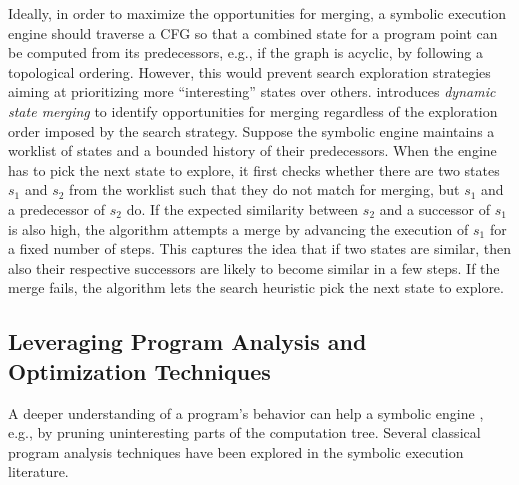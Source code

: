 
 Ideally, in order to maximize the opportunities for merging, a symbolic execution engine should traverse a CFG so that a combined state for a program point can be computed from its predecessors, e.g., if the graph is acyclic, by following a topological ordering. However, this would prevent search exploration strategies aiming at prioritizing more ``interesting'' states over others. \cite{KKB-PLDI12} introduces {\em dynamic state merging} to identify opportunities for merging regardless of the exploration order imposed by the search strategy.
Suppose the symbolic engine maintains a worklist of states and a bounded history of their predecessors. When the engine has to pick the next state to explore, it first checks whether there are two states $s_1$ and $s_2$ from the worklist such that they do not match for merging, but $s_1$ and a predecessor of $s_2$ do. If the expected similarity between $s_2$ and a successor of $s_1$ is also high, the algorithm attempts a merge by advancing the execution of $s_1$ for a fixed number of steps. This captures the idea that if two states are similar, then also their respective successors are likely to become similar in a few steps. If the merge fails, the algorithm lets the search heuristic pick the next state to explore.


\subsection{Leveraging Program Analysis and Optimization Techniques}
\label{ss:program-analysis}

A deeper understanding of a program's behavior can help a symbolic engine , e.g., by pruning uninteresting parts of the computation tree. Several classical program analysis techniques have been explored in the symbolic execution literature. 

